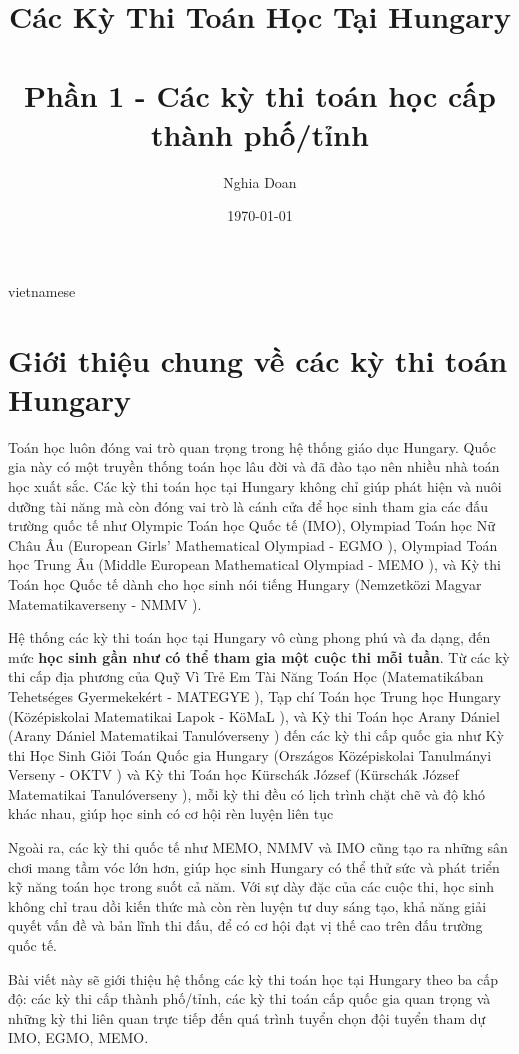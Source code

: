 \documentclass{article}
\title{Các Kỳ Thi Toán Học Tại Hungary\\ \quad \\Phần 1 - Các kỳ thi toán học cấp thành phố/tỉnh}
\author{Nghia Doan}
\date{\today}
\begin{document}
\begin{otherlanguage*}{vietnamese}

\maketitle

\section{Giới thiệu chung về các kỳ thi toán Hungary}

Toán học luôn đóng vai trò quan trọng trong hệ thống giáo dục Hungary. Quốc gia này có một truyền thống toán học lâu đời và đã đào tạo nên nhiều nhà toán học xuất sắc.
Các kỳ thi toán học tại Hungary không chỉ giúp phát hiện và nuôi dưỡng tài năng mà còn đóng vai trò là cánh cửa để học sinh tham gia các đấu trường quốc tế
như Olympic Toán học Quốc tế (IMO), Olympiad Toán học Nữ Châu Âu (European Girls' Mathematical Olympiad - EGMO \cite{EGMO}),
Olympiad Toán học Trung Âu (Middle European Mathematical Olympiad - MEMO \cite{MEMO}),
và Kỳ thi Toán học Quốc tế dành cho học sinh nói tiếng Hungary (Nemzetközi Magyar Matematikaverseny - NMMV \cite{NMMV}).

Hệ thống các kỳ thi toán học tại Hungary vô cùng phong phú và đa dạng, đến mức \textbf{học sinh gần như có thể tham gia một cuộc thi mỗi tuần}.
Từ các kỳ thi cấp địa phương của Quỹ Vì Trẻ Em Tài Năng Toán Học (Matematikában Tehetséges Gyermekekért - MATEGYE \cite{MATEGYE}),
Tạp chí Toán học Trung học Hungary (Középiskolai Matematikai Lapok - KöMaL \cite{KoMaL}), và Kỳ thi Toán học Arany Dániel (Arany Dániel Matematikai Tanulóverseny \cite{AranyDaniel})
đến các kỳ thi cấp quốc gia như Kỳ thi Học Sinh Giỏi Toán Quốc gia Hungary (Országos Középiskolai Tanulmányi Verseny - OKTV \cite{OKTV}) 
và Kỳ thi Toán học Kürschák József (Kürschák József Matematikai Tanulóverseny \cite{Kurschak}),
mỗi kỳ thi đều có lịch trình chặt chẽ và độ khó khác nhau, giúp học sinh có cơ hội rèn luyện liên tục

Ngoài ra, các kỳ thi quốc tế như MEMO, NMMV và IMO cũng tạo ra những sân chơi mang tầm vóc lớn hơn,
giúp học sinh Hungary có thể thử sức và phát triển kỹ năng toán học trong suốt cả năm.
Với sự dày đặc của các cuộc thi, học sinh không chỉ trau dồi kiến thức mà còn rèn luyện tư duy sáng tạo, khả năng giải quyết vấn đề và bản lĩnh thi đấu,
để có cơ hội đạt vị thế cao trên đấu trường quốc tế.

Bài viết này sẽ giới thiệu hệ thống các kỳ thi toán học tại Hungary theo ba cấp độ: các kỳ thi cấp thành phố/tỉnh, các kỳ thi toán cấp quốc gia quan trọng
và những kỳ thi liên quan trực tiếp đến quá trình tuyển chọn đội tuyển tham dự IMO, EGMO, MEMO.


\end{otherlanguage*}
\end{document}
